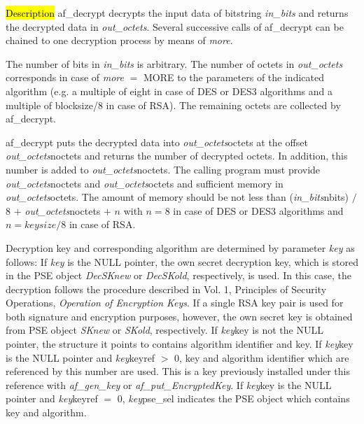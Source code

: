 \hl{Description}
af\_decrypt decrypts the input data of bitstring {\em in\_bits} and returns the decrypted data
in {\em out\_octets}. Several successive calls of af\_decrypt can be chained
to one decryption process by means of {\em more}.

The number of bits in {\em in\_bits} is arbitrary. The number of octets in {\em out\_octets}
corresponds in case of {\em more} $=$ MORE to the parameters of the indicated algorithm
(e.g. a multiple of eight in case of DES or DES3 algorithms and a multiple of blocksize/8
in case of RSA). The remaining octets are collected by af\_decrypt.

af\_decrypt puts the decrypted data into {\em out\_octets}\pf octets at the offset
{\em out\_octets}\pf noctets and returns the number of decrypted octets. In addition, this number is added 
to {\em out\_octets}\pf noctets.
The calling program must provide {\em out\_octets}\pf noctets and {\em out\_octets}\pf octets and sufficient
memory in {\em out\_octets}\pf octets.
The amount of memory should be not less than
({\em in\_bits}\pf nbits) $/$ 8 $+$ {\em out\_octets}\pf noctets $+$ $n$ with $n = 8$ 
in case of DES or DES3 algorithms and $n = keysize / 8$ in case of RSA.

Decryption key and corresponding algorithm are determined by parameter {\em key} as follows:
\be
\m If {\em key} is the NULL pointer,
   the own secret decryption key, which is stored in the PSE object
   {\em DecSKnew} or {\em DecSKold}, respectively, is used. 
   In this case, the decryption follows
   the procedure described in Vol. 1, Principles of Security Operations, {\em Operation of
   Encryption Keys}.
   If a single RSA key pair is used for both signature and encryption purposes, however, the own secret key is
   obtained from PSE object {\em SKnew} or {\em SKold}, respectively.
\m If {\em key}\pf key is not the NULL pointer, the structure it points to
   contains algorithm identifier and key.
\m If {\em key}\pf key is the NULL pointer and {\em key}\pf keyref $>$ 0,
   key and algorithm identifier which are referenced by this number are used. This is a key
   previously installed under this reference with {\em af\_gen\_key} or 
   {\em af\_put\_EncryptedKey}.
\m If {\em key}\pf key is the NULL pointer and {\em key}\pf keyref $=$ 0,
   {\em key}\pf pse\_sel indicates the PSE object which contains key and algorithm.
\ee


